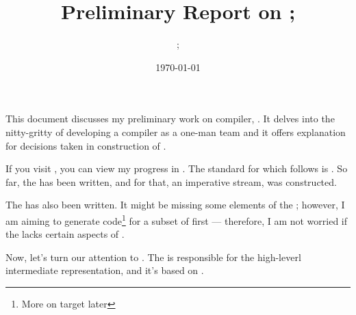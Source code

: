 \documentclass[a4paper]{artcile}
\begin{document}
\title{Preliminary Report on \ccnm; \ccurl}
\author{\ccauth; \authurl}
\date{\today}

This document discusses my preliminary work on \cclang{} compiler, \ccnm. It delves into the nitty-gritty of developing a \cclang{} compiler as a one-man team and it offers explanation for decisions taken in construction of \ccnm.

If you visit \ccurl, you can view my progress in \ccnm. The standard for \cclang{} which \ccnm{} follows is \ccstd. So far, the \cclexer{} has been written, and for that, an imperative stream,  was constructed. 

The \ccast{} has also been written. It might be missing some elements of the \ccstd{}; however, I am aiming to generate code\footnote{More on target later} for a subset of \cclang{} first --- therefore, I am not worried if the \ccast{} lacks certain aspects of \ccstd.

Now, let's turn our attention to \cchir. The  is responsible for the high-leverl intermediate representation, and it's based on .
\end{document}
